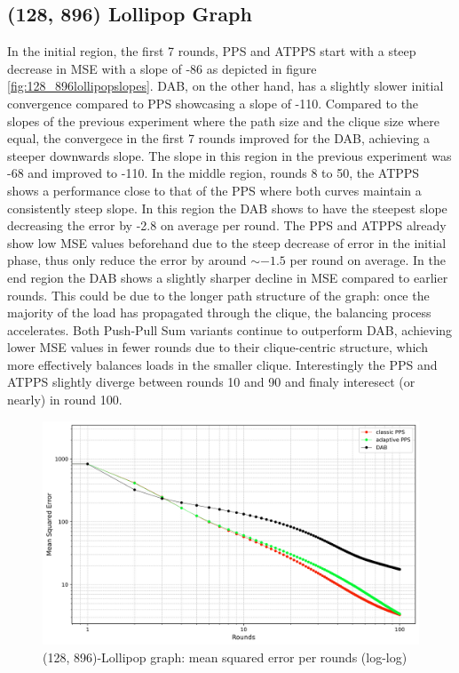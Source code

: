 \subsection{(128, 896) Lollipop Graph}\label{subsec:128_896lollipop}
In the initial region, the first 7 rounds, PPS and ATPPS start with a steep decrease in MSE with a slope of -86 as depicted in figure \ref{fig:128_896lollipopslopes}. DAB, on the other hand, has a slightly slower initial convergence compared to PPS showcasing a slope of -110. Compared to the slopes of the previous experiment where the path size and the clique size where equal, the convergece in the first 7 rounds improved for the DAB, achieving a steeper downwards slope. The slope in this region in the previous experiment was -68 and improved to -110. In the middle region, rounds 8 to 50, the ATPPS shows a performance close to that of the PPS where both curves maintain a consistently steep slope. In this region the DAB shows to have the steepest slope decreasing the error by -2.8 on average per round. The PPS and ATPPS already show low MSE values beforehand due to the steep decrease of error in the initial phase, thus only reduce the error by around $\sim -1.5$ per round on average. In the end region the DAB shows a slightly sharper decline in MSE compared to earlier rounds. This could be due to the longer path structure of the graph: once the majority of the load has propagated through the clique, the balancing process accelerates. Both Push-Pull Sum variants continue to outperform DAB, achieving lower MSE values in fewer rounds due to their clique-centric structure, which more effectively balances loads in the smaller clique. Interestingly the PPS and ATPPS slightly diverge between rounds 10 and 90 and finaly interesect (or nearly) in round 100.

\begin{figure}[]
    \centering
    \includegraphics[width=\linewidth]{figures/Simulation_outcomes/LollipopGraph/128_896/DAB_vs_PPS_LG_r100_n1024_averaged_loglog.png}
    \caption{(128, 896)-Lollipop graph: mean squared error per rounds (log-log)}
    \label{fig:128_896lollipopgraphMSEperRoundLogLog}
\end{figure}

